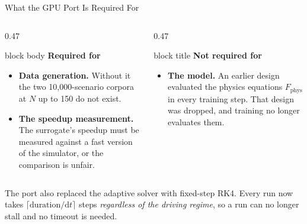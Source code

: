 \begin{frame}{What the GPU Port Is Required For}
  \vspace{0.5em}
  \begin{columns}[T,onlytextwidth]
    \begin{column}{0.47\textwidth}
      \begin{beamercolorbox}[wd=\linewidth,sep=7pt]{block body}
        {\small\textbf{Required for}}
      \end{beamercolorbox}
      \vspace{0.4em}
      \begin{itemize}\setlength\itemsep{0.4em}
        \item[] {\footnotesize \textbf{Data generation.} Without it the two
              10,000-scenario corpora at $N$ up to 150 do not exist.}
        \item[] {\footnotesize \textbf{The speedup measurement.} The surrogate's
              speedup must be measured against a fast version of the simulator,
              or the comparison is unfair.}
      \end{itemize}
    \end{column}
    \begin{column}{0.47\textwidth}
      \begin{beamercolorbox}[wd=\linewidth,sep=7pt]{block title}
        {\small\textbf{Not required for}}
      \end{beamercolorbox}
      \vspace{0.4em}
      \begin{itemize}\setlength\itemsep{0.4em}
        \item[] {\footnotesize \textbf{The model.} An earlier design evaluated
              the physics equations $F_{\mathrm{phys}}$ in every training step.
              That design was dropped, and \alert{training no longer evaluates
              them}.}
      \end{itemize}
    \end{column}
  \end{columns}

  \vspace{0.9em}
  \begin{minipage}{0.94\textwidth}\footnotesize
    The port also replaced the adaptive solver with fixed-step RK4. Every run
    now takes $\lceil \text{duration}/\mathrm{d}t \rceil$ steps \emph{regardless
    of the driving regime}, so a run can no longer stall and no timeout is
    needed.
  \end{minipage}
\end{frame}

